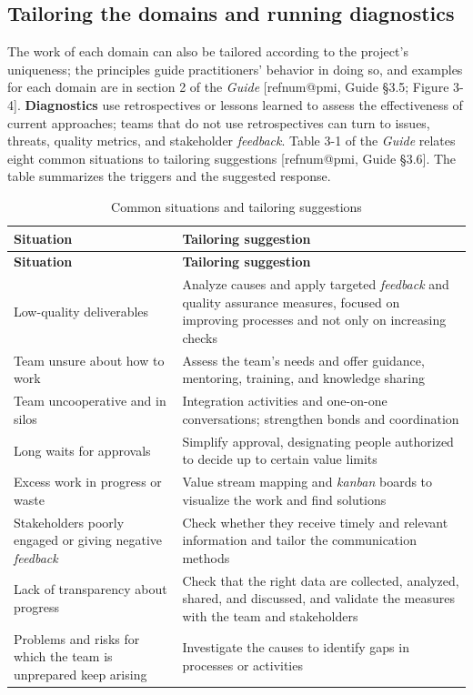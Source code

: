 \documentclass[11pt,a4paper]{article}
\makeatletter
\newcommand{\refnum}[1]{\csname refnum@#1\endcsname}
\newcommand{\cit}[1]{[\refnum{#1}]}
\newcommand{\SingleSpacing}{}
\newcommand{\fontetab}[1]{\par\vspace{3pt}{\small\noindent Source: #1\par}}
\makeatother
\begin{document}
\subsection{Tailoring the domains and running diagnostics}

The work of each domain can also be tailored according to the project's uniqueness; the principles guide practitioners' behavior in doing so, and examples for each domain are in section 2 of the \textit{Guide} [\refnum{pmi}, Guide §3.5; Figure 3-4]. \textbf{Diagnostics} use retrospectives or lessons learned to assess the effectiveness of current approaches; teams that do not use retrospectives can turn to issues, threats, quality metrics, and stakeholder \textit{feedback}. Table 3-1 of the \textit{Guide} relates eight common situations to tailoring suggestions [\refnum{pmi}, Guide §3.6]. The table summarizes the triggers and the suggested response.

\begingroup\SingleSpacing\small
\begin{longtable}{@{}>{\raggedright\arraybackslash}p{}>{\raggedright\arraybackslash}p{}@{}}
\caption{Common situations and tailoring suggestions}\label{tab:t11}\\
\toprule
\textbf{Situation} & \textbf{Tailoring suggestion}\\
\midrule
\endfirsthead
\toprule
\textbf{Situation} & \textbf{Tailoring suggestion}\\
\midrule
\endhead
\bottomrule
\endfoot
\bottomrule
\endlastfoot
Low-quality deliverables & Analyze causes and apply targeted \textit{feedback} and quality assurance measures, focused on improving processes and not only on increasing checks\\[3pt]
Team unsure about how to work & Assess the team's needs and offer guidance, mentoring, training, and knowledge sharing\\[3pt]
Team uncooperative and in silos & Integration activities and one-on-one conversations; strengthen bonds and coordination\\[3pt]
Long waits for approvals & Simplify approval, designating people authorized to decide up to certain value limits\\[3pt]
Excess work in progress or waste & Value stream mapping and \textit{kanban} boards to visualize the work and find solutions\\[3pt]
Stakeholders poorly engaged or giving negative \textit{feedback} & Check whether they receive timely and relevant information and tailor the communication methods\\[3pt]
Lack of transparency about progress & Check that the right data are collected, analyzed, shared, and discussed, and validate the measures with the team and stakeholders\\[3pt]
Problems and risks for which the team is unprepared keep arising & Investigate the causes to identify gaps in processes or activities\\[3pt]
\end{longtable}
\endgroup
\fontetab{Prepared by the authors (2026), based on \cit{pmi}.}
\end{document}
